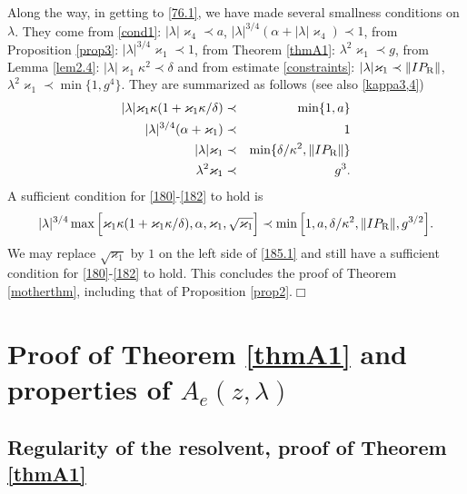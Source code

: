 \documentclass[letterpaper,onecolumn,11pt,accepted=2021-12-09]{quantumarticle}
\numberwithin{equation}{section}
\renewcommand{\r}{{\rm R}}
\def\qed{\hfill $\Box$\medskip}
\begin{document}
Along the way, in getting to \eqref{76.1}, we have made several smallness conditions on $\lambda$. They come from \eqref{cond1}: $|\lambda|\varkappa_4\prec a$, $|\lambda|^{3/4}(\alpha+|\lambda|\varkappa_4)\prec 1$, from Proposition \ref{prop3}: $|\lambda|^{3/4}\varkappa_1\prec 1$, from Theorem \ref{thmA1}: $\lambda^2\varkappa_1\prec g$,  from Lemma \ref{lem2.4}: $|\lambda|\varkappa_1\kappa^2\prec \delta$ and from estimate \eqref{constraints}: $|\lambda|\varkappa_1\prec \|I P_\r\|$, $\lambda^2\varkappa_1\prec\min\{1,g^4\}$.  They are  summarized as follows (see also \eqref{kappa3,4})
\begin{eqnarray}
|\lambda| \varkappa_1\kappa (1+\varkappa_1\kappa/\delta)&\prec& \min\{1,a\} \label{180}\\
|\lambda|^{3/4}(\alpha+\varkappa_1) &\prec& 1\\
|\lambda|\varkappa_1 &\prec& \min\{\delta/\kappa^2, \|I P_\r\|\}\\
\lambda^2\varkappa_1&\prec& g^3.
\label{182}
\end{eqnarray}
A sufficient condition for \eqref{180}-\eqref{182} to hold is
\begin{eqnarray}
|\lambda|^{3/4} \max\Big[ \varkappa_1\kappa (1+\varkappa_1\kappa/\delta), \alpha,\varkappa_1, \sqrt{\varkappa_1}\Big]\prec \min\Big[ 1,a,\delta/\kappa^2, \|I P_\r\|, g^{3/2}\Big].
\label{185.1}
\end{eqnarray}
We may replace $\sqrt{\varkappa_1}$ by $1$ on the left side of \eqref{185.1} and still have a sufficient condition for \eqref{180}-\eqref{182} to hold. 
This concludes the proof of Theorem \ref{motherthm}, including that of Proposition \ref{prop2}.\qed  






\section{Proof of Theorem \ref{thmA1} and properties of $A_e(z,\lambda)$}



\subsection{Regularity of the resolvent, proof of Theorem \ref{thmA1}}
\end{document}
